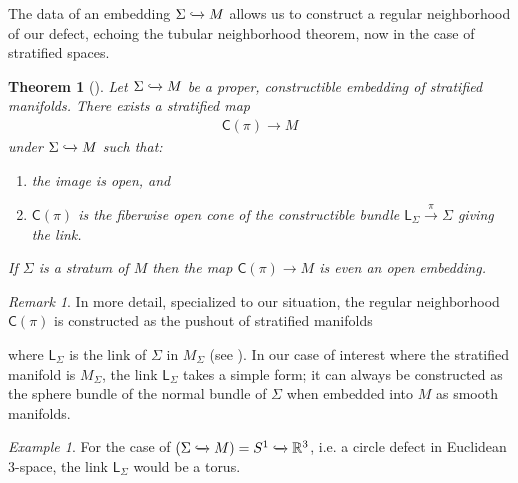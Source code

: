 \documentclass[12pt,a4paper]{article}
\newcounter{counter} \numberwithin{counter}{section}
\theoremstyle{definition}
\theoremstyle{plain}
\newtheorem{theorem}[counter]{Theorem}
\theoremstyle{remark}
\newtheorem{example}[counter]{Example}
\newtheorem{remark}[counter]{Remark}
\newcommand{\hoint}{\mathbb{R}_{\geq 0}}
\begin{document}
The data of an embedding $\Sigma \xhookrightarrow{} M$ allows us to construct a regular neighborhood of our defect, echoing the tubular neighborhood theorem, now in the case of stratified spaces.
%
\begin{theorem}[{\cite[prop.8.2.3, prop.8.2.5]{aft_localstrut}}]
    Let $\Sigma \xhookrightarrow{} M$ be a proper, constructible embedding of stratified manifolds. There exists a stratified map
    \begin{align}
        \mathsf{C}(\pi) \rightarrow M
    \end{align}
    under $\Sigma \xhookrightarrow{} M$ such that:
    \begin{enumerate}
        \item the image is open, and
        \item $\mathsf{C}(\pi)$ is the fiberwise open cone of the constructible bundle $\mathsf{L}_{\Sigma} \xrightarrow{\pi} \Sigma$ giving the link.
    \end{enumerate}
    If $\Sigma$ is a stratum of $M$ then the map $\mathsf{C}(\pi) \rightarrow M$ is even an open embedding.
\end{theorem}

\begin{remark}
    In more detail, specialized to our situation, the regular neighborhood $\mathsf{C}(\pi)$ is constructed as the pushout of stratified manifolds
    \begin{center}
    \end{center}
    where $\mathsf{L}_{\Sigma}$ is the link of $\Sigma$ in $M_{\Sigma}$ (see \cite{aft_localstrut}). In our case of interest where the stratified manifold is $M_{\Sigma}$, the link $\mathsf{L}_{\Sigma}$ takes a simple form; it can always be constructed as the sphere bundle of the normal bundle of $\Sigma$ when embedded into $M$ as smooth manifolds.
\end{remark}

\begin{example}
    For the case of $(\Sigma \xhookrightarrow{} M) = {S^1 \xhookrightarrow{} \mathbb{R}^3}$, i.e. a circle defect in Euclidean 3-space, the link $\mathsf{L}_{\Sigma}$ would be a torus.
\end{example}
\end{document}
